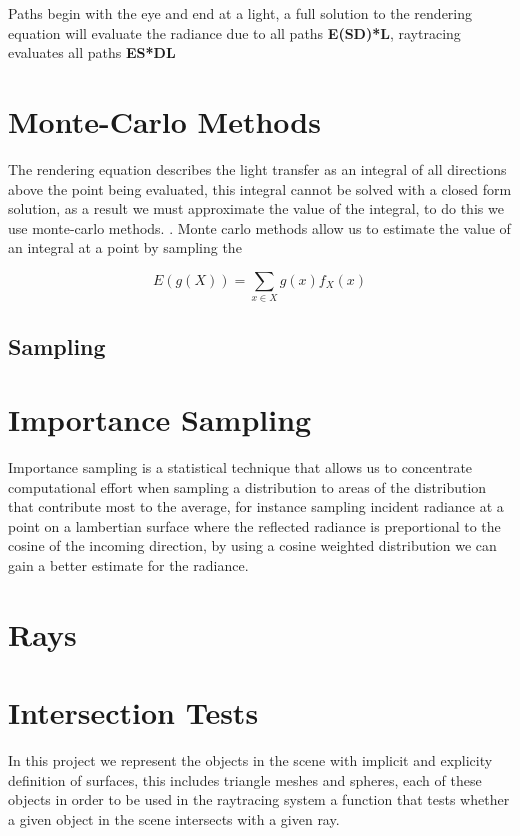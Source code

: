Paths begin with the eye and end at a light, a full solution to the rendering equation will evaluate the radiance due
to all paths \textbf{E(S\textbar D)*L}, raytracing evaluates all paths \textbf{ES*DL}

\section{Monte-Carlo Methods}
The rendering equation describes the light transfer as an integral of all directions above the point being evaluated, this
integral cannot be solved with a closed form solution, as a result we must approximate the value of the integral, to do this
we use monte-carlo methods. . Monte carlo methods allow us to estimate the value of an integral at a point
by sampling the 

\begin{equation}
E\left(g\left(X\right)\right) = \sum\limits_{x \in X} g\left(x\right)f_X\left(x\right)
\end{equation}


\subsection{Sampling}
\section{Importance Sampling}
Importance sampling is a statistical technique that allows us to concentrate computational effort when sampling a distribution
to areas of the distribution that contribute most to the average, for instance sampling incident radiance at a point on a lambertian
surface where the reflected radiance is preportional to the cosine of the incoming direction, by using a cosine weighted distribution
we can gain a better estimate for the radiance.

\section{Rays}

\section{Intersection Tests}
In this project we represent the objects in the scene with implicit and explicity definition of surfaces, this includes
triangle meshes and spheres, each of these objects in order to be used in the raytracing system a function that tests
whether a given object in the scene intersects with a given ray.
